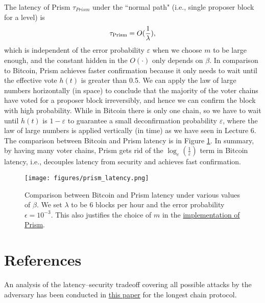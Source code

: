 \documentclass{article}
\newcommand{\pramod}[1]{{\color{red}
\footnotesize[Pramod: #1] }}
\begin{document}
The latency of {\sf Prism} $\tau_{Prism}$ under the ``normal path" (i.e., single proposer block for a level) is 
\begin{equation*}
    \tau_{\rm Prism} = O(\frac{1}{\lambda}),
\end{equation*}
which is independent of the error probability $\varepsilon$ when we choose $m$ to be large enough, and the constant hidden in the $O(\cdot)$ only depends on $\beta$. 
In comparison to Bitcoin, {\sf Prism} achieves faster confirmation because it only needs to wait until the effective vote $h(t)$ is greater than 0.5. We can apply the law of large numbers horizontally (in space) to conclude that the majority of the voter chains have voted for a proposer block irreversibly, and hence we can confirm the block with high probability. 
While in Bitcoin there is only one chain, so we have to wait until $h(t)$ is $1-\varepsilon$ to guarantee a small deconfirmation probability $\varepsilon$, where the law of large numbers is applied vertically (in time) as we have seen in Lecture 6. The comparison between Bitcoin and {\sf Prism} latency is in Figure \ref{fig:prismlatency}.
In summary, by having many voter chains, {\sf Prism} gets rid of the $\log_e(\frac{1}{\varepsilon})$ term in Bitcoin latency, i.e., decouples latency from security and achieves fast confirmation.



\begin{figure}
    \centering
    \texttt{[image: figures/prism\_latency.png]}
    \caption{Comparison between Bitcoin and {\sf Prism} latency under various values of $\beta$. We set $\lambda$ to be 6 blocks per hour and the error probability $\epsilon = 10^{-3}$. This also justifies the choice of $m$ in the \href{https://arxiv.org/abs/1909.11261}{implementation of {\sf Prism}}.}
    \label{fig:prismlatency}
\end{figure}



\section*{References}

An analysis of the  latency–security tradeoff covering all possible attacks by the adversary has been conducted in \href{https://arxiv.org/pdf/2011.14051.pdf}{this paper}  for the longest chain protocol. 
\end{document}
